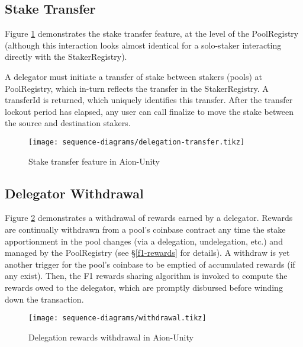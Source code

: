 \subsection{Stake Transfer}

Figure \ref{fig:delegation_transfer} demonstrates the stake transfer feature, at the level of the PoolRegistry (although this interaction looks almost identical for a solo-staker interacting directly with the StakerRegistry). 

A delegator must initiate a transfer of stake between stakers (pools) at PoolRegistry, which in-turn reflects the transfer in the StakerRegistry. A transferId is returned, which uniquely identifies this transfer. After the transfer lockout period has elapsed, any user can call finalize to move the stake between the source and destination stakers.

\begin{figure}[ht]
\centering
\texttt{[image: sequence-diagrams/delegation-transfer.tikz]}
\caption{Stake transfer feature in Aion-Unity}
\label{fig:delegation_transfer}
\end{figure}
\clearpage

\subsection{Delegator Withdrawal}

Figure \ref{fig:withdrawal} demonstrates a withdrawal of rewards earned by a delegator. Rewards are continually withdrawn from a pool's coinbase contract any time the stake apportionment in the pool changes (via a delegation, undelegation, etc.) and managed by the PoolRegistry (see \S\ref{f1-rewards} for details). A withdraw is yet another trigger for the pool's coinbase to be emptied of accumulated rewards (if any exist). Then, the F1 rewards sharing algorithm is invoked to compute the rewards owed to the delegator, which are promptly disbursed before winding down the transaction. 

\begin{figure}[ht]
\centering
\texttt{[image: sequence-diagrams/withdrawal.tikz]}
\caption{Delegation rewards withdrawal in Aion-Unity}
\label{fig:withdrawal}
\end{figure}
\clearpage